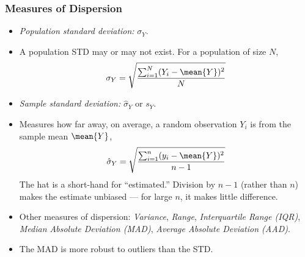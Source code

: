 

\begin{frame}
\frametitle{Measures of Dispersion}
\begin{itemize}
\item \emph{Population standard deviation:} \quad $\sigma_{Y}$.
\item A population STD may or may not exist. For a population of size $N$, 
\begin{align*}
\sigma_Y = \sqrt{\dfrac{\sum_{i=1}^N (Y_i-\mean{Y})^2}{N}}
\end{align*}
\item \emph{Sample standard deviation:} \quad $\hat\sigma_{Y}$ or $s_{Y}$.
\item Measures how far away, on average, a random observation $Y_i$ is from the sample mean $\mean{Y}$,
\begin{align*}
\hat\sigma_Y = \sqrt{\dfrac{\sum_{i=1}^n (y_i-\mean{Y})^2}{n-1}}
\end{align*}
The hat is a short-hand for ``estimated.'' Division by $n-1$ (rather than $n$) makes the estimate unbiased --- for large $n$, it makes little difference.
\item Other measures of dispersion: \emph{Variance}, \emph{Range}, \emph{Interquartile Range (IQR)}, \emph{Median Absolute Deviation (MAD)}, \emph{Average Absolute Deviation (AAD)}.
\item The MAD is more robust to outliers than the STD.
\end{itemize}
\end{frame}

